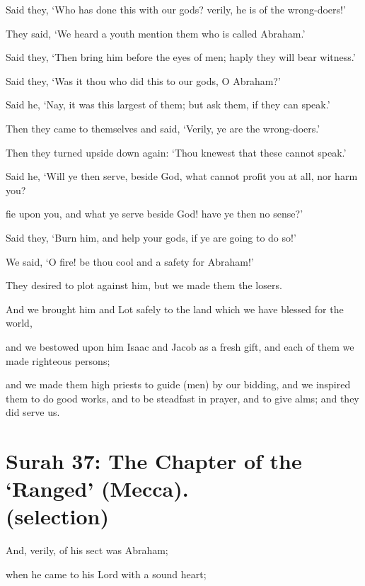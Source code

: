 \documentclass[fontsize=14pt, letterpaper, notitlepage, openany, DIV=12]{scrbook} %
\begin{document}
\noindent[21:59]
Said they, `Who has done this with our gods? verily, he is of the wrong-doers!'

\noindent[21:60]
They said, `We heard a youth mention them who is called Abraham.'

\noindent[21:61]
Said they, `Then bring him before the eyes of men; haply they will bear witness.'

\noindent[21:62]
Said they, `Was it thou who did this to our gods, O Abraham?'

\noindent[21:63]
Said he, `Nay, it was this largest of them; but ask them, if they can speak.'

\noindent[21:64]
Then they came to themselves and said, `Verily, ye are the wrong-doers.'

\noindent[21:65]
Then they turned upside down again: `Thou knewest that these cannot speak.'

\noindent[21:66]
Said he, `Will ye then serve, beside God, what cannot profit you at all, nor harm you?

\noindent[21:67]
fie upon you, and what ye serve beside God! have ye then no sense?'

\noindent[21:68]
Said they, `Burn him, and help your gods, if ye are going to do so!'

\noindent[21:69]
We said, `O fire! be thou cool and a safety for Abraham!'

\noindent[21:70]
They desired to plot against him, but we made them the losers.

\noindent[21:71]
And we brought him and Lot safely to the land which we have blessed for the world,

\noindent[21:72]
and we bestowed upon him Isaac and Jacob as a fresh gift, and each of them we made
righteous persons;

\noindent[21:73]
and we made them high priests to guide (men) by our bidding, and we inspired them to
do good works, and to be steadfast in prayer, and to give alms; and they did serve us.


\section[Surah 37: The Chapter of the `Ranged' (Mecca).]{Surah 37: The Chapter of the `Ranged' (Mecca).\\ (selection)}


\noindent[37:83]
And, verily, of his sect was Abraham;

\noindent[37:84]
when he came to his Lord with a sound heart;
\end{document}
